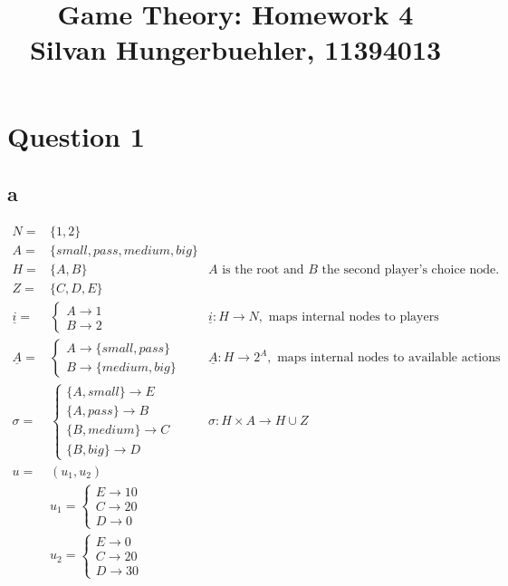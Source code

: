 \documentclass[10pt,a4paper]{article}
\title{%
  Game Theory: Homework 4 \\
  \large Silvan Hungerbuehler, 11394013}
\date{}
\begin{document}
\maketitle

\section*{Question 1}
\subsection*{a}
\begin{align*}
N=&\{1,2\} \\
A=&\{small,pass,medium,big\} \\
H=&\{A,B\}  &\text{$A$ is the root and $B$ the second player's choice node.}\\
Z=&\{C,D,E\} \\
\underline{i}=&\begin{cases}
A\rightarrow 1 \\
B \rightarrow 2 
\end{cases}&\underline{i}: H\rightarrow N,\text{ maps internal nodes to players} \\
\underline{A}=&\begin{cases}
A\rightarrow\{small,pass\} \\
B\rightarrow\{medium,big\} 
\end{cases} &\underline{A}:H\rightarrow 2^A,\text{ maps internal nodes to available actions} \\
\sigma=& \begin{cases}
\{A,small\}\rightarrow E \\
\{A,pass\}\rightarrow B\\
\{B,medium\}\rightarrow C\\
\{B,big\}\rightarrow D
\end{cases}  &\sigma :H\times A\rightarrow H\cup Z\\
u=&(u_1,u_2)\\
&u_1=\begin{cases}
E\rightarrow 10\\
C\rightarrow 20\\
D\rightarrow 0
\end{cases}\\
&u_2=\begin{cases}
E\rightarrow 0\\
C\rightarrow 20\\
D\rightarrow 30
\end{cases}
\end{align*}
\end{document}
